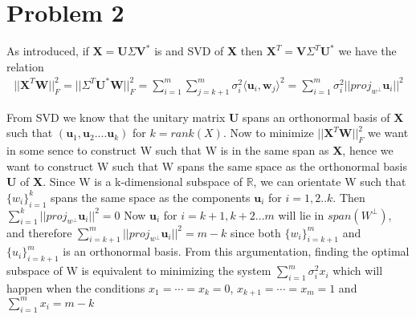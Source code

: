 \documentclass[a4paper,norsk]{article}
\begin{document}
\section{Problem 2}
As introduced, if $\textbf{X} = \textbf{U} \Sigma \textbf{V}^*$ is and SVD of \textbf{X} then  $\textbf{X}^T = \textbf{V} \Sigma^T \textbf{U}^*$ we have the relation \newline
\begin{align*}
||\textbf{X}^T \textbf{W}||_F^2 = ||\Sigma^T \textbf{U}^* \textbf{W}||_F^2 = \sum_{i=1}^m \sum_{j=k+1}^m \sigma_i^2  \langle \textbf{u}_i , \textbf{w}_j\rangle^2 =
\sum_{i=1}^m \sigma_i^2 || proj_{w^{\perp}} \textbf{u}_i||^2 
\end{align*}

From SVD we know that the unitary matrix \textbf{U} spans an orthonormal basis of \textbf{X} such that $(\textbf{u}_1, \textbf{u}_2 .... \textbf{u}_k)$ for $k=rank(X)$. Now to minimize 
$||\textbf{X}^T \textbf{W}||_F^2$ we want in some sence to construct W such that W is in the same span as \textbf{X}, hence we want to construct W such that W spans the same space as the
orthonormal basis \textbf{U} of \textbf{X}. \newline
Since W is a k-dimensional subspace of $\mathbb{R}$, we can orientate W such that $\{w_i\}_{i=1}^{k}$ spans the same space as the components $\textbf{u}_i$ for $i=1,2..k$.  
Then $\sum_{i=1}^k || proj_{w^{\perp}} \textbf{u}_i||^2 = 0$ \newline
Now $\textbf{u}_i$ for $i=k+1, k+2...m$ will lie in $span(W^\perp)$, and therefore $\sum_{i=k+1}^m || proj_{w^{\perp}} \textbf{u}_i||^2 = m-k$ since both  $\{w_i\}_{i=k+1}^{m}$ and
 $\{u_i\}_{i=k+1}^{m}$ is an orthonormal basis. \newline \newline
From this argumentation, finding the optimal subspace of W is equivalent to minimizing the system $\sum_{i=1}^m \sigma_i^2 x_i$ which will happen when the conditions
$x_1 = \cdots = x_k = 0$, \hspace{2mm} $x_{k+1} = \cdots = x_m = 1 $ and $\sum_{i=1}^m x_i = m - k$ 


\newpage
\end{document}
